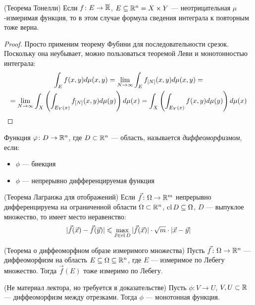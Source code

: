 \begin{corollary} (Теорема Тонелли)
	Если $f \colon E \to \overline{\mathbb{R}}$, $E \subseteq \mathbb{R}^n = X \times Y$ --- неотрицательная $\mu$-измеримая функция, то в этом случае формула сведения интеграла к повторным тоже верна.
\end{corollary}

\begin{proof}
	Просто применим теорему Фубини для последовательности срезок. Поскольку она неубывает, можно пользоваться теоремой Леви и монотонностью интеграла:
	\begin{multline*}
		\int_E f(x, y)d\mu(x, y) = \lim_{N \to \infty} \int_E f_{[N]}(x, y)d\mu(x, y) = \\ = \lim_{N \to \infty} \int_X \left(\int_{E_Y(x)} f_{[N]}(x, y)d\mu(y)\right)d\mu(x) = \int_X \left(\int_{E_Y(x)} f(x, y)d\mu(y)\right)d\mu(x)
	\end{multline*}
\end{proof}

\begin{reminder}
	Функция $\varphi \colon D \to \mathbb{R}^n$, где $D \subset \mathbb{R}^n$ --- область, называется \textit{диффеоморфизмом}, если:
	\begin{itemize}
		\item $\phi$ --- биекция
		
		\item $\phi$ --- непрерывно дифференцируемая функция
	\end{itemize}
\end{reminder}

\begin{reminder} (Теорема Лагранжа для отображений)
	Если $\vec{f} \colon \Omega \to \mathbb{R}^m$ непрерывно дифференцируема на ограниченной области $\Omega \subset \mathbb{R}^n$, $\operatorname{cl} D \subseteq \Omega$, $D$ --- выпуклое множество, то имеет место неравенство:
	\[
		|\vec{f}(\vec{x}) - \vec{f}(\vec{y})| \leqslant \max_{\vec{x} \in \operatorname{cl} D} |\vec{f}(\vec{x})| \cdot \sqrt{m} \cdot |\vec{x} - \vec{y}|
	\]
\end{reminder}

\begin{reminder} (Теорема о диффеоморфном образе измеримого множества)
	Пусть $\vec{f} \colon \Omega \to \mathbb{R}^n$ --- диффеоморфизм на область $E \subseteq \Omega \subseteq \mathbb{R}^n$, где $E$ --- измеримое по Лебегу множество. Тогда $\vec{f}(E)$ тоже измеримо по Лебегу.
\end{reminder}

\begin{proposition} (Не материал лектора, но требуется в доказательстве)
	Пусть $\phi \colon V \to U$, $V, U \subset \mathbb{R}$ --- диффеоморфизм между отрезками. Тогда $\phi$ --- монотонная функция.
\end{proposition}

